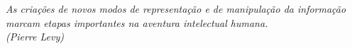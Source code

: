 
\renewcommand{\epigraphname}{EPÍGRAFE}

\begin{epigrafe}

\textit{As criações de novos modos de representação e de manipulação da informação marcam etapas importantes na aventura intelectual humana.\\
(Pierre Levy)}

\end{epigrafe}


